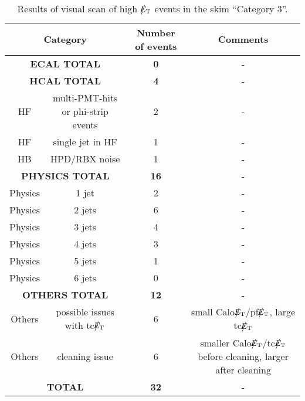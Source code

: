 \begin{table}[h]
  \begin{center}
    \begin{tabular}{|c|c|c|c|}
      \hline
      \multicolumn{2}{|c|}{Category} & Number of events  & Comments   \\ 
      \hline\hline
      \multicolumn{2}{|c|}{\bf ECAL TOTAL} & \bf{0}      & - \\
      \hline    
      \multicolumn{2}{|c|}{\bf HCAL TOTAL} & \bf{4}      & - \\
      \hline
      HF & multi-PMT-hits or phi-strip events & 2 & - \\           
      HF & single jet in HF & 1 & - \\           
      HB & HPD/RBX noise & 1 & - \\           
      \hline    
      \multicolumn{2}{|c|}{\bf PHYSICS TOTAL} & \bf{16}      & - \\
      \hline
      Physics & 1 jet & 2 & - \\
      Physics & 2 jets & 6 & - \\
      Physics & 3 jets & 4 & - \\
      Physics & 4 jets & 3 & - \\
      Physics & 5 jets & 1 & - \\
      Physics & 6 jets & 0 & - \\
      \hline
      \multicolumn{2}{|c|}{\bf OTHERS TOTAL} & \bf{12}      & - \\
      \hline          
      Others & possible issues with tc$\big\slash\hspace{-1.6ex}{E_\text{T}}$ & 6 & small Calo$\big\slash\hspace{-1.6ex}{E_\text{T}}$/pf$\big\slash\hspace{-1.6ex}{E_\text{T}}$, large tc$\big\slash\hspace{-1.6ex}{E_\text{T}}$ \\
      Others & cleaning issue & 6 & smaller Calo$\big\slash\hspace{-1.6ex}{E_\text{T}}$/tc$\big\slash\hspace{-1.6ex}{E_\text{T}}$ before cleaning, larger after cleaning \\
      \hline          
      \multicolumn{2}{|c|}{\bf TOTAL} & \bf{32}      & - \\
      \hline
    \end{tabular}
    \caption{Results of visual scan of high $\big\slash\hspace{-1.6ex}{E_\text{T}}$ events in the skim ``Category 3''.}
    \label{tab:Category3}
  \end{center}
\end{table}
